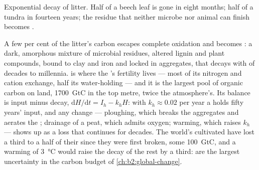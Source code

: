 \begin{omfigure}

{\small Exponential decay of litter. Half of a beech leaf is gone
in eight months; half of a tundra  in fourteen years; the
residue that neither microbe nor animal can finish becomes .}
\end{omfigure}

\begin{proposition}\label{prop:b2:living-soil:humus}
A few per cent of the litter's carbon escapes complete oxidation
and becomes \emph{}: a dark, amorphous mixture of microbial
residues, altered lignin and plant compounds, bound to clay and
iron and locked in aggregates, that decays with  of
decades to millennia.  is where the 's fertility lives
--- most of its nitrogen and cation exchange, half its water-holding
--- and it is the largest pool of organic carbon on land,
\qty{1700}{GtC} in the top metre, twice the atmosphere's. Its
balance is input minus decay, $\mathrm{d}H/\mathrm{d}t = I_h - k_hH$:
with $k_h \approx 0.02$ per year a  holds fifty years' input,
and any change --- ploughing, which breaks the aggregates and
aerates the ; drainage of a peat, which admits oxygen;
warming, which raises $k_h$ --- shows up as a loss that continues
for decades. The world's cultivated  have lost a third to a
half of their  since they were first broken, some
\qty{100}{GtC}, and a warming of \qty{3}{\celsius} would raise the
decay of the rest by a third:  are the largest uncertainty in
the carbon budget of \cref{ch:b2:global-change}.
\end{proposition}

